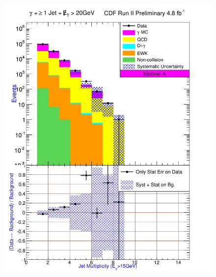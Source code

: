 \begin{figure}[h!]
{\includegraphics[keepaspectratio=true, scale=\resultsHistScale]{G30JetsMet20_MtdA_plot1_NJet.pdf}}

\end{figure}
